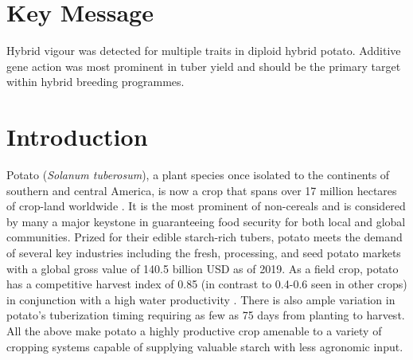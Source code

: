 \section{Key Message}\label{key-message}

Hybrid vigour was detected for multiple traits in diploid hybrid potato. Additive gene action was most prominent in tuber yield and should be the primary target within hybrid breeding programmes.

\newpage

%
%
%
%
%
%
%
%
\linenumbers %



\section{Introduction}

Potato (\emph{Solanum tuberosum}), a plant species once isolated to the continents of southern and central America, is now a crop that spans over 17 million hectares of crop-land worldwide \citep{faostat2021}. It is the most prominent of non-cereals and is considered by many a major keystone in guaranteeing food security for both local and global communities. Prized for their edible starch-rich tubers, potato meets the demand of several key industries including the fresh, processing, and seed potato markets with a global gross value of 140.5 billion USD as of 2019. As a field crop, potato has a competitive harvest index of 0.85 (in contrast to 0.4-0.6 seen in other crops) in conjunction with a high water productivity \citep{Hay1995, Lutaladio2009}. There is also ample variation in potato's tuberization timing requiring as few as 75 days from planting to harvest. All the above make potato a highly productive crop amenable to a variety of cropping systems capable of supplying valuable starch with less agronomic input.

